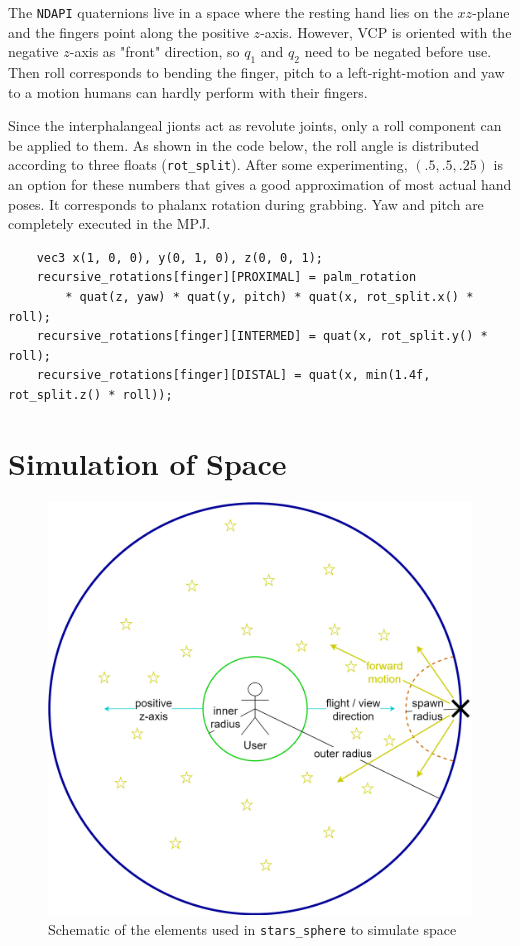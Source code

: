 \documentclass[hyperref, bachelorofscience]{cgvpub}
\begin{document}
The \lstinline|NDAPI| quaternions live in a space where the resting hand lies on the $ xz $-plane and the fingers point along the positive $ z $-axis. However, \gls{VCP} is oriented with the negative $ z $-axis as "front" direction, so $ q_{1} $ and $ q_{2} $ need to be negated before use. Then roll corresponds to bending the finger, pitch to a left-right-motion and yaw to a motion humans can hardly perform with their fingers.

Since the interphalangeal jionts act as revolute joints, only a roll component can be applied to them. As shown in the code below, the roll angle is distributed according to three floats (\lstinline|rot_split|). After some experimenting, $ (.5, .5, .25) $ is an option for these numbers that gives a good approximation of most actual hand poses. It corresponds to phalanx rotation during grabbing. Yaw and pitch are completely executed in the \gls{MPJ}. 
\begin{lstlisting}
	vec3 x(1, 0, 0), y(0, 1, 0), z(0, 0, 1);
	recursive_rotations[finger][PROXIMAL] = palm_rotation
		* quat(z, yaw) * quat(y, pitch) * quat(x, rot_split.x() * roll);
	recursive_rotations[finger][INTERMED] = quat(x, rot_split.y() * roll);
	recursive_rotations[finger][DISTAL] = quat(x, min(1.4f, rot_split.z() * roll));
\end{lstlisting}

\section{Simulation of Space} \label{sec:space}
\begin{figure}
	\centering
	\includegraphics[width=.7\linewidth]{../pics/stars_sphere_schema}
	\caption{Schematic of the elements used in \lstinline|stars_sphere| to simulate space}
	\label{fig:space}
\end{figure}
\end{document}
